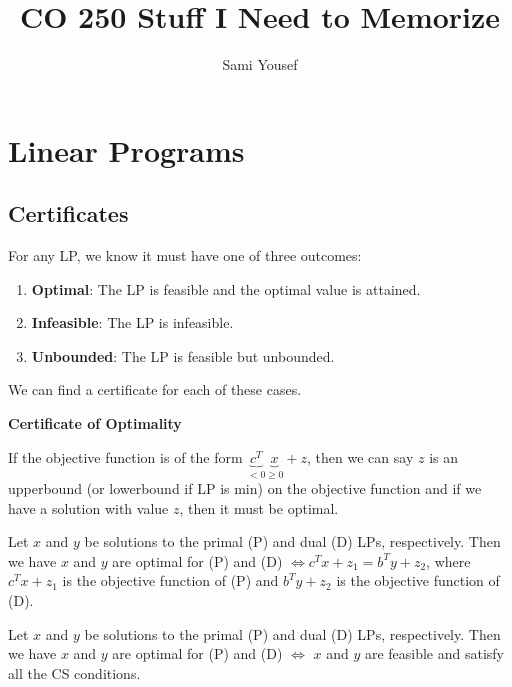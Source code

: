 \documentclass[a4paper]{report}
\author{Sami Yousef}
\title{CO 250 Stuff I Need to Memorize}
\begin{document}
\maketitle

\tableofcontents


\chapter{Linear Programs}
\section{Certificates}
For any LP, we know it must have one of three outcomes:
\begin{enumerate}
  \item \textbf{Optimal}: The LP is feasible and the optimal value is attained.
  \item \textbf{Infeasible}: The LP is infeasible.
  \item \textbf{Unbounded}: The LP is feasible but unbounded.
\end{enumerate}

We can find a certificate for each of these cases.

\begin{definition*}
  \textbf{Certificate of Optimality}
\item \begin{definition}\label{optimality:i}
  If the objective function is of the form $\underbrace{c^T}_{<0} \underbrace{x}_{\geq 0} + z$, then we can say $z$ is an upperbound (or lowerbound if LP is min) on the objective function and if we have a solution with value $z$, then it must be optimal.
\end{definition}

\item \begin{definition}\label{optimality:ii}
  Let $x$ and $y$ be solutions to the primal (P) and dual (D) LPs, respectively. Then we have $x$ and $y$ are optimal for (P) and (D) $\Longleftrightarrow c^Tx + z_1 = b^Ty + z_2$, where $c^Tx + z_1$ is the objective function of (P) and $b^Ty + z_2$ is the objective function of (D).
\end{definition}

\item \begin{definition}\label{optimality:iii}
  Let $x$ and $y$ be solutions to the primal (P) and dual (D) LPs, respectively. Then we have $x$ and $y$ are optimal for (P) and (D) $\Longleftrightarrow$ $x$ and $y$ are feasible and satisfy all the CS conditions.
\end{definition}

\end{definition*}
\end{document}
